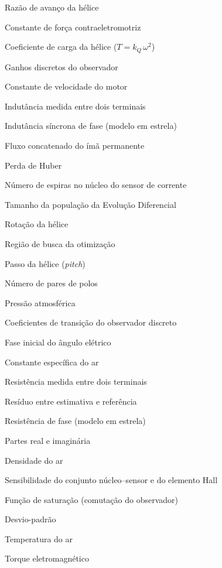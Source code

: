 \begin{simbolos}
	\item[$J_{prop}$] Razão de avanço da hélice
	\item[$K_e, k_e$] Constante de força contraeletromotriz
	\item[$k_Q$] Coeficiente de carga da hélice ($T = k_Q\,\omega^2$)
	\item[$K_{s1}, K_{s2}, K_t$] Ganhos discretos do observador
	\item[$K_v$] Constante de velocidade do motor
	\item[$L_{LL}$] Indutância medida entre dois terminais
	\item[$L_s, L_Y$] Indutância síncrona de fase (modelo em estrela)
	\item[$\lambda_m$] Fluxo concatenado do ímã permanente
	\item[$\ell_\delta$] Perda de Huber
	\item[$N$] Número de espiras no núcleo do sensor de corrente
	\item[$N_p$] Tamanho da população da Evolução Diferencial
	\item[$n_{prop}$] Rotação da hélice
	\item[$\Omega$] Região de busca da otimização
	\item[$P$] Passo da hélice (\textit{pitch})
	\item[$p$] Número de pares de polos
	\item[$P_{atm}$] Pressão atmosférica
	\item[$\Phi_i, \Phi_e$] Coeficientes de transição do observador discreto
	\item[$\varphi_0$] Fase inicial do ângulo elétrico
	\item[$R_{ar}$] Constante específica do ar
	\item[$R_{LL}$] Resistência medida entre dois terminais
	\item[$r_n$] Resíduo entre estimativa e referência
	\item[$R_s, R_Y$] Resistência de fase (modelo em estrela)
	\item[$\mathrm{Re}\{\cdot\}, \mathrm{Im}\{\cdot\}$] Partes real e imaginária
	\item[$\rho$] Densidade do ar
	\item[$S, S_H$] Sensibilidade do conjunto núcleo--sensor e do elemento Hall
	\item[$\mathrm{Sat}(\cdot)$] Função de saturação (comutação do observador)
	\item[$\sigma$] Desvio-padrão
	\item[$T$] Temperatura do ar
	\item[$T_e$] Torque eletromagnético

\end{simbolos}
